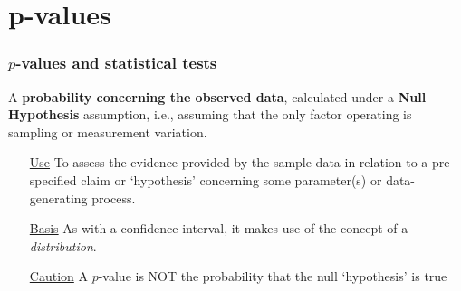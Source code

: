 \documentclass[10pt]{beamer}\usepackage[]{graphicx}\usepackage[]{color}
\begin{document}
\section{p-values}

\begin{frame}
	\frametitle{$p$-values and statistical tests}
	
	
	\begin{definition}[$p$-value]
		A \textbf{probability concerning the observed data}, calculated under a \textbf{Null Hypothesis} assumption, i.e., assuming that the only factor operating is sampling or measurement variation. 
	\end{definition}
	
	\begin{itemize} 
		\item[\underline{Use}] To assess the evidence provided by the sample data
		in relation to a pre-specified claim or `hypothesis' concerning some parameter(s) or data-generating process. 
		\item[\underline{Basis}] As with a confidence interval, it makes use of the concept of a \textit{distribution}. 
		\item[\underline{Caution}] A $p$-value is NOT the probability that the null `hypothesis' is true
	\end{itemize}
\end{frame}
\end{document}
